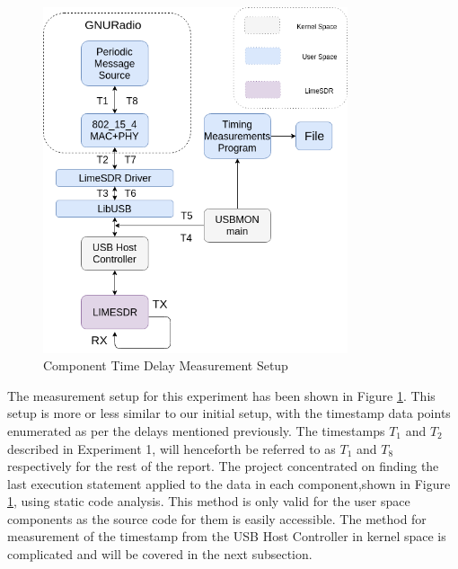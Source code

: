  \begin{figure}[h!]
\centering
\includegraphics[width=0.8\textwidth]{Figure/Setup2.png}
\caption{Component Time Delay Measurement Setup}
\label{component_setup}
\end{figure}

The measurement setup for this experiment has been shown in Figure \ref{component_setup}.
This setup is more or less similar to our initial setup, with the timestamp data points enumerated as per the delays mentioned previously.
The timestamps $T_1$ and $T_2$ described in Experiment 1, will henceforth be referred to as $T_1$ and $T_8$ respectively for the rest of the report.
The project concentrated on finding the last execution statement applied to the data in each component,shown in Figure \ref{component_setup}, using static code analysis.
This method is only valid for the user space components as the source code for them is easily accessible.
The method for measurement of the timestamp from the USB Host Controller in kernel space is complicated and will be covered in the next subsection.\\

